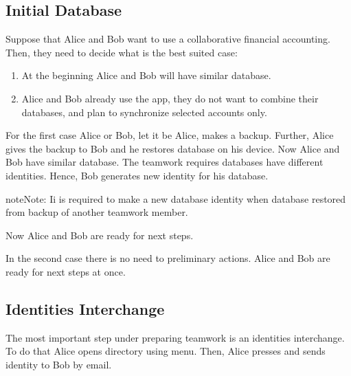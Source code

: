 \documentclass[a4paper,10pt,english]{sphinxmanual}
\begin{document}
\subsection{Initial Database}
\label{\detokenize{teamwork:initial-database}}
\sphinxAtStartPar
Suppose that Alice and Bob want to use a collaborative financial accounting.
Then, they need to decide what is the best suited case:
\begin{enumerate}
%
\item {} 
\sphinxAtStartPar
At the beginning Alice and Bob will have similar database.

\item {} 
\sphinxAtStartPar
Alice and Bob already use the app, they do not want to combine their databases, and plan to synchronize selected accounts only.

\end{enumerate}

\sphinxAtStartPar
For the first case Alice or Bob, let it be Alice, makes a backup. Further, Alice gives the
backup to Bob and he restores database on his device. Now Alice and Bob have similar database.
The teamwork requires databases have different identities. Hence, Bob generates new identity
for his database.

\begin{sphinxadmonition}{note}{Note:}
\sphinxAtStartPar
Ii is required to make a new database identity when database restored from backup of another teamwork member.
\end{sphinxadmonition}

\noindent{}
\noindent{}
\noindent{}
\noindent{}
\noindent{}

\sphinxAtStartPar
Now Alice and Bob are ready for next steps.

\sphinxAtStartPar
In the second case there is no need to preliminary actions. Alice and Bob are ready for next steps at once.


\subsection{Identities Interchange}
\label{\detokenize{teamwork:identities-interchange}}
\sphinxAtStartPar
The most important step under preparing teamwork is an identities interchange. To do that
Alice opens  directory using  menu. Then,
Alice presses  and sends identity to Bob by email.
\end{document}
